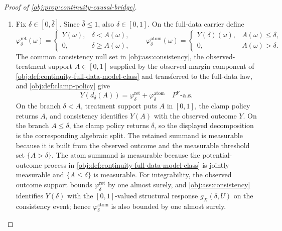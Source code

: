 \begin{proof}[Proof of \cref{obj:prop:continuity-causal-bridge}]
\begin{enumerate}
\[
m_x^{\mathrm F}(a)\pi_x(a)
=
\mu_{x,\mathrm{cont}}^P(a)\pi_x(a)
\quad\text{for Lebesgue-a.e. }a\in[0,\bar\delta].
\]
For Lebesgue-a.e. \(a\in(0,\bar\delta]\), \cref{obj:ass:polynomial-thinning} also gives
\[
\pi_x(a)\ge c_-a^\kappa>0 .
\]
Since the endpoint \(0\) has Lebesgue measure zero, the two continuous functions \(m_x^{\mathrm F}\) and \(\mu_{x,\mathrm{cont}}^P\) agree Lebesgue-a.e. on \([0,\bar\delta]\).  Applying the continuous-version uniqueness principle in \cref{obj:lem:continuity-regression-extension-unique},
\[
m_x^{\mathrm F}(a)=\mu_{x,\mathrm{cont}}^P(a)
\qquad
\text{for every }a\in[0,\bar\delta].
\]

\item Fix \(\delta\in[0,\bar\delta]\).  Since \(\bar\delta\le1\), also \(\delta\in[0,1]\).  On the full-data carrier define
\[
\varphi_{\delta}^{\mathrm{ret}}(\omega)
=
\begin{cases}
Y(\omega),& \delta<A(\omega),\\
0,& \delta\ge A(\omega),
\end{cases}
\qquad
\varphi_{\delta}^{\mathrm{atom}}(\omega)
=
\begin{cases}
Y(\delta)(\omega),& A(\omega)\le\delta,\\
0,& A(\omega)>\delta.
\end{cases}
\]
The common consistency null set in \cref{obj:ass:consistency}, the observed-treatment support \(A\in[0,1]\) supplied by the observed-margin component of \cref{obj:def:continuity-full-data-model-class} and transferred to the full-data law, and \cref{obj:def:clamp-policy} give
\[
Y\!\left(d_\delta(A)\right)
=
\varphi_{\delta}^{\mathrm{ret}}
+
\varphi_{\delta}^{\mathrm{atom}}
\quad
P^{\mathrm F}\text{-a.s.}
\]
On the branch \(\delta<A\), treatment support puts \(A\) in \([0,1]\), the clamp policy returns \(A\), and consistency identifies \(Y(A)\) with the observed outcome \(Y\).  On the branch \(A\le\delta\), the clamp policy returns \(\delta\), so the displayed decomposition is the corresponding algebraic split.  The retained summand is measurable because it is built from the observed outcome and the measurable threshold set \(\{A>\delta\}\).  The atom summand is measurable because the potential-outcome process in \cref{obj:def:continuity-full-data-model-class} is jointly measurable and \(\{A\le\delta\}\) is measurable.  For integrability, the observed outcome support bounds \(\varphi_{\delta}^{\mathrm{ret}}\) by one almost surely, and \cref{obj:ass:consistency} identifies \(Y(\delta)\) with the \([0,1]\)-valued structural response \(g_X(\delta,U)\) on the consistency event; hence \(\varphi_{\delta}^{\mathrm{atom}}\) is also bounded by one almost surely.


\end{enumerate}
\end{proof}
